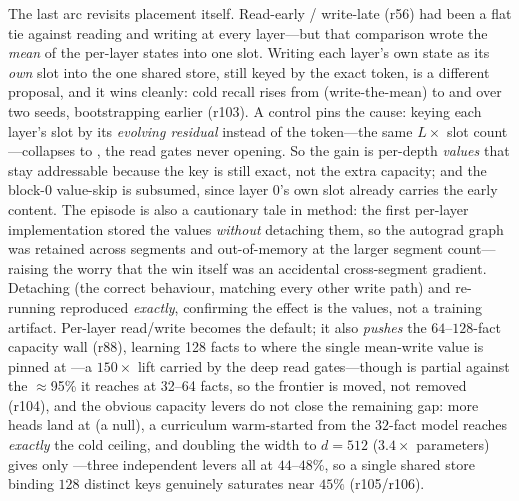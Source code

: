The last arc revisits placement itself. Read-early / write-late (r56) had been a flat tie
against reading and writing at every layer---but that comparison wrote the \emph{mean} of
the per-layer states into one slot. Writing each layer's own state as its \emph{own} slot
into the one shared store, still keyed by the exact token, is a different proposal, and it
wins cleanly: cold recall rises from  (write-the-mean) to  and
 over two seeds, bootstrapping earlier (r103). A control pins the cause:
keying each layer's slot by its \emph{evolving residual} instead of the token---the same
$L\times$ slot count---collapses to , the read gates never opening. So the gain
is per-depth \emph{values} that stay addressable because the key is still exact, not the
extra capacity; and the block-0 value-skip is subsumed, since layer $0$'s own slot already
carries the early content. The episode is also a cautionary tale in method: the first
per-layer implementation stored the values \emph{without} detaching them, so the autograd
graph was retained across segments and out-of-memory at the larger segment count---raising
the worry that the win itself was an accidental cross-segment gradient. Detaching (the
correct behaviour, matching every other write path) and re-running reproduced
 \emph{exactly}, confirming the effect is the values, not a training artifact.
Per-layer read/write becomes the default; it also \emph{pushes} the $64$--$128$-fact
capacity wall (r88), learning 128 facts to  where the single mean-write value
is pinned at ---a $150\times$ lift carried by the deep read gates---though
 is partial against the $\approx$95\% it reaches at 32--64 facts, so the
frontier is moved, not removed (r104), and the obvious capacity levers do not close the
remaining gap: more heads land at  (a null), a curriculum warm-started from the
$32$-fact model reaches \emph{exactly} the cold  ceiling, and doubling the width
to $d{=}512$ ($3.4\times$ parameters) gives only ---three independent levers all
at $44$--$48\%$, so a single shared store binding $128$ distinct keys genuinely saturates near
$45\%$ (r105/r106).

